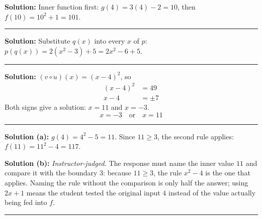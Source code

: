 \documentclass[12pt]{article}
\begin{document}



\textbf{Solution:} Inner function first: $g(4) = 3(4) - 2 = 10$, then $f(10) = 10^{2} + 1 = 101$. 

\vspace{0.1cm}\noindent\rule{\linewidth}{0.2pt}


\textbf{Solution:} Substitute $q(x)$ into every $x$ of $p$: $p(q(x)) = 2\left(x^{2} - 3\right) + 5 = 2x^{2} - 6 + 5$. 

\vspace{0.1cm}\noindent\rule{\linewidth}{0.2pt}


\textbf{Solution:} $(v \circ u)(x) = (x - 4)^{2}$, so
\begin{align*}
  (x - 4)^{2} &= 49 \\
  x - 4 &= \pm 7
\end{align*}
Both signs give a solution: $x = 11$ and $x = -3$.
\[ \boxed{x = -3 \quad \text{or} \quad x = 11} \]

\vspace{0.1cm}\noindent\rule{\linewidth}{0.2pt}


\textbf{Solution (a):} $g(4) = 4^{2} - 5 = 11$. Since $11 \geq 3$, the second rule applies: $f(11) = 11^{2} - 4 = 117$. 

\textbf{Solution (b):} \emph{Instructor-judged.} The response must name the inner value $11$ and compare it with the boundary $3$: because $11 \geq 3$, the rule $x^{2} - 4$ is the one that applies. Naming the rule without the comparison is only half the answer; using $2x + 1$ means the student tested the original input $4$ instead of the value actually being fed into $f$.

\vspace{0.1cm}\noindent\rule{\linewidth}{0.2pt}

\end{document}
